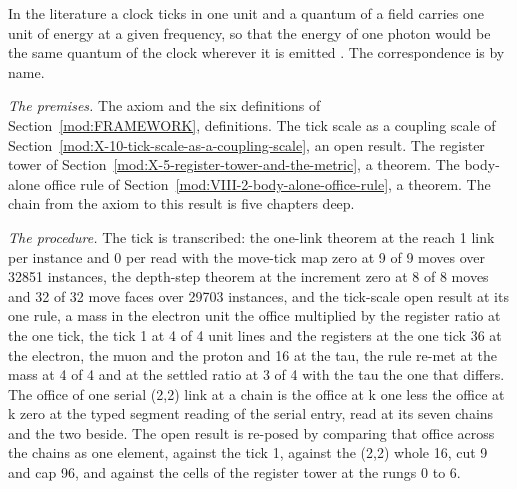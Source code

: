 \begin{chbridge}
In the literature a clock ticks in one unit and a quantum of a field carries one unit of energy at a given frequency, so that the energy of one photon would be the same quantum of the clock wherever it is emitted \cite{Planck1899,Wilczek2005}. The correspondence is by name.
\end{chbridge}
\begin{chproof}
\textit{The premises.} The axiom and the six definitions of Section~\ref{mod:FRAMEWORK}, definitions. The tick scale as a coupling scale of Section~\ref{mod:X-10-tick-scale-as-a-coupling-scale}, an open result. The register tower of Section~\ref{mod:X-5-register-tower-and-the-metric}, a theorem. The body-alone office rule of Section~\ref{mod:VIII-2-body-alone-office-rule}, a theorem. The chain from the axiom to this result is five chapters deep.

\textit{The procedure.} The tick is transcribed: the one-link theorem at the reach 1 link per instance and 0 per read with the move-tick map zero at 9 of 9 moves over 32851 instances, the depth-step theorem at the increment zero at 8 of 8 moves and 32 of 32 move faces over 29703 instances, and the tick-scale open result at its one rule, a mass in the electron unit the office multiplied by the register ratio at the one tick, the tick 1 at 4 of 4 unit lines and the registers at the one tick 36 at the electron, the muon and the proton and 16 at the tau, the rule re-met at the mass at 4 of 4 and at the settled ratio at 3 of 4 with the tau the one that differs. The office of one serial (2,2) link at a chain is the office at k one less the office at k zero at the typed segment reading of the serial entry, read at its seven chains and the two beside. The open result is re-posed by comparing that office across the chains as one element, against the tick 1, against the (2,2) whole 16, cut 9 and cap 96, and against the cells of the register tower at the rungs 0 to 6.


\end{chproof}
